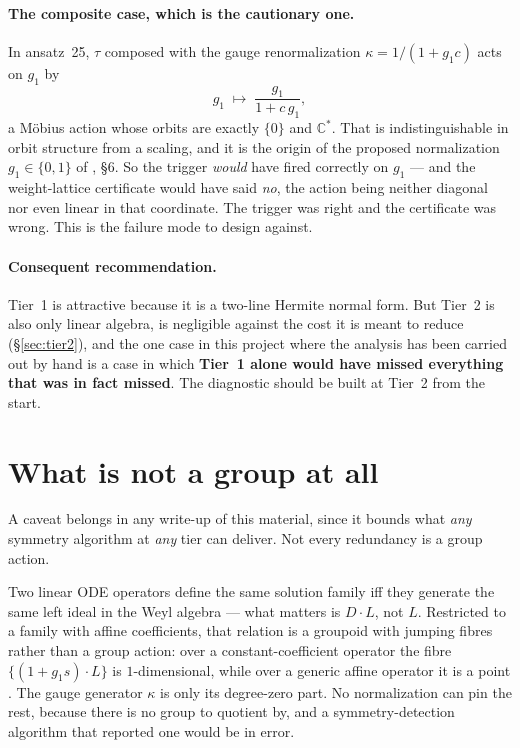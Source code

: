 \documentclass[11pt]{article}
\newcommand{\CC}{\mathbb{C}}
\theoremstyle{plain}
\theoremstyle{definition}
\theoremstyle{remark}
\begin{document}
\paragraph{The composite case, which is the cautionary one.} In ansatz~25,
$\tau$ composed with the gauge renormalization $\kappa = 1/(1+g_1c)$ acts on
$g_1$ by
\[
   g_1 \;\longmapsto\; \frac{g_1}{1 + c\,g_1} ,
\]
a M\"obius action whose orbits are exactly $\{0\}$ and $\CC^*$. That is
indistinguishable in orbit structure from a scaling, and it is the origin of
the proposed normalization $g_1 \in \{0,1\}$ of \cite{ansatz25}, \S6. So the
trigger \emph{would} have fired correctly on $g_1$ --- and the weight-lattice
certificate would have said \emph{no}, the action being neither diagonal nor
even linear in that coordinate. The trigger was right and the certificate was
wrong. This is the failure mode to design against.

\paragraph{Consequent recommendation.} Tier~1 is attractive because it is a
two-line Hermite normal form. But Tier~2 is also only linear algebra, is
negligible against the cost it is meant to reduce (\S\ref{sec:tier2}), and the
one case in this project where the analysis has been carried out by hand is a
case in which \textbf{Tier~1 alone would have missed everything that was in
fact missed}. The diagnostic should be built at Tier~2 from the start.

\section{What is not a group at all}
\label{sec:notagroup}

A caveat belongs in any write-up of this material, since it bounds what
\emph{any} symmetry algorithm at \emph{any} tier can deliver. Not every
redundancy is a group action.

Two linear ODE operators define the same solution family iff they generate the
same left ideal in the Weyl algebra --- what matters is $D\cdot L$, not $L$.
Restricted to a family with affine coefficients, that relation is a groupoid
with jumping fibres rather than a group action: over a constant-coefficient
operator the fibre $\{(1 + g_1 s)\cdot L\}$ is $1$-dimensional, while over a
generic affine operator it is a point \cite{ansatz25}. The gauge generator
$\kappa$ is only its degree-zero part. No normalization can pin the rest,
because there is no group to quotient by, and a symmetry-detection algorithm
that reported one would be in error.
\end{document}
